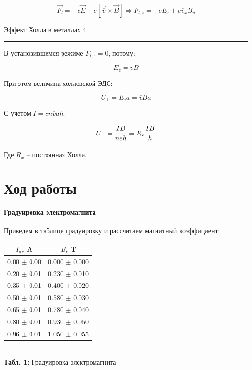 \documentclass[12pt,a4paper]{scrartcl}
\begin{document}
	$$\vec{F_l} = -e\vec{E} - e\left[\vec{\overline{v}} \times \vec{B}\right] \Rightarrow F_{l, z} = -e E_z + e \overline{v}_x B_y$$
	
	\newpage
	
	
	\begin{flushleft}
		\footnotesize{Эффект Холла в металлах} \hspace{\fill} \footnotesize{4}
		\\[-0.3cm]\noindent\rule{\textwidth}{0.3pt}
	\end{flushleft}	
	
	В установившемся режиме $F_{l, z} = 0$, потому:
	
	$$E_z = \overline{v} B$$
	
	При этом величина холловской ЭДС:
	
	$$U_\perp = E_z a = \overline{v} B a$$
	
	С учетом $I = en\overline{v}ah$:
	
	$$U_{\perp} = \dfrac{\strut IB}{\strut neh} = R_x\dfrac{\strut IB}{\strut h}$$
	
	Где $R_x$ -- постоянная Холла.
	
	\section{Ход работы}
	
	\paragraph{Градуировка электромагнита} \hfill
	
	Приведем в таблице градуировку и рассчитаем магнитный коэффициент:
	
	\begin{center}
		\begin{tabular}{|c|c|}
			\hline
			$I_a$, A & $B$, T
			\\\hline
			0.00 $\pm$ 0.00 & 0.000 $\pm$ 0.000
			\\\hline
			0.20 $\pm$ 0.01 & 0.230 $\pm$ 0.010
			\\\hline
			0.35 $\pm$ 0.01 & 0.400 $\pm$ 0.020
			\\\hline
			0.50 $\pm$ 0.01 & 0.580 $\pm$ 0.030
			\\\hline
			0.65 $\pm$ 0.01 & 0.780 $\pm$ 0.040
			\\\hline
			0.80 $\pm$ 0.01 & 0.930 $\pm$ 0.050
			\\\hline
			0.96 $\pm$ 0.01 & 1.050 $\pm$ 0.055
			\\\hline
		\end{tabular}
		\\\textbf{Табл. 1:} Градуировка электромагнита
	\end{center}
	
\end{document}
